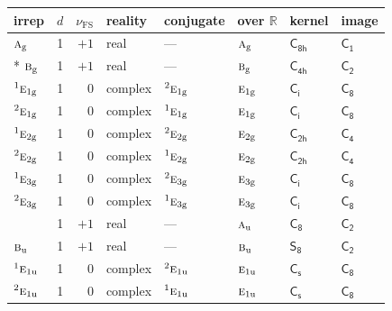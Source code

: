 \documentclass[10pt,a4paper]{article}
\numberwithin{equation}{section}
\newcommand{\grp}[1]{\mathsf{#1}}
\newcommand{\irr}[1]{\text{\normalfont\scshape #1}}
\newcommand{\conjpair}[1]{{}^{#1}}
\newcommand{\detbox}[1]{{\setlength{\fboxsep}{1pt}\fbox{#1}}}
\newcommand{\ptag}[1]{\mathrm{#1}}
\newcommand{\fsind}{\nu_{\mathrm{FS}}}
\begin{document}
{\small\renewcommand{\arraystretch}{1.25}\setlength{\tabcolsep}{4pt}\begin{longtable}{@{}lrrlllll@{}}\toprule
irrep & $d$ & $\fsind$ & reality & conjugate & over $\mathbb{R}$ & kernel & image\\\midrule\endhead
\bottomrule\endfoot\endlastfoot
$\irr{a}_{\ptag{g}}$ & 1 & $+1$ & real & --- & $\irr{a}_{\ptag{g}}$ & \href{C8h.pdf}{$\grp{C_{8h}}$} & \href{C1.pdf}{$\grp{C_{1}}$}\\*
$\irr{b}_{\ptag{g}}$ & 1 & $+1$ & real & --- & $\irr{b}_{\ptag{g}}$ & \href{C4h.pdf}{$\grp{C_{4h}}$} & \href{C2.pdf}{$\grp{C_{2}}$}\\
$\conjpair{1}\irr{e}_{1\ptag{g}}$ & 1 & $0$ & complex & $\conjpair{2}\irr{e}_{1\ptag{g}}$ & $\irr{e}_{1\ptag{g}}$ & \href{S2.pdf}{$\grp{C_{i}}$} & \href{C8.pdf}{$\grp{C_{8}}$}\\
$\conjpair{2}\irr{e}_{1\ptag{g}}$ & 1 & $0$ & complex & $\conjpair{1}\irr{e}_{1\ptag{g}}$ & $\irr{e}_{1\ptag{g}}$ & \href{S2.pdf}{$\grp{C_{i}}$} & \href{C8.pdf}{$\grp{C_{8}}$}\\
$\conjpair{1}\irr{e}_{2\ptag{g}}$ & 1 & $0$ & complex & $\conjpair{2}\irr{e}_{2\ptag{g}}$ & $\irr{e}_{2\ptag{g}}$ & \href{C2h.pdf}{$\grp{C_{2h}}$} & \href{C4.pdf}{$\grp{C_{4}}$}\\
$\conjpair{2}\irr{e}_{2\ptag{g}}$ & 1 & $0$ & complex & $\conjpair{1}\irr{e}_{2\ptag{g}}$ & $\irr{e}_{2\ptag{g}}$ & \href{C2h.pdf}{$\grp{C_{2h}}$} & \href{C4.pdf}{$\grp{C_{4}}$}\\
$\conjpair{1}\irr{e}_{3\ptag{g}}$ & 1 & $0$ & complex & $\conjpair{2}\irr{e}_{3\ptag{g}}$ & $\irr{e}_{3\ptag{g}}$ & \href{S2.pdf}{$\grp{C_{i}}$} & \href{C8.pdf}{$\grp{C_{8}}$}\\
$\conjpair{2}\irr{e}_{3\ptag{g}}$ & 1 & $0$ & complex & $\conjpair{1}\irr{e}_{3\ptag{g}}$ & $\irr{e}_{3\ptag{g}}$ & \href{S2.pdf}{$\grp{C_{i}}$} & \href{C8.pdf}{$\grp{C_{8}}$}\\
\detbox{$\irr{a}_{\ptag{u}}$} & 1 & $+1$ & real & --- & $\irr{a}_{\ptag{u}}$ & \href{C8.pdf}{$\grp{C_{8}}$} & \href{C2.pdf}{$\grp{C_{2}}$}\\
$\irr{b}_{\ptag{u}}$ & 1 & $+1$ & real & --- & $\irr{b}_{\ptag{u}}$ & \href{S8.pdf}{$\grp{S_{8}}$} & \href{C2.pdf}{$\grp{C_{2}}$}\\
$\conjpair{1}\irr{e}_{1\ptag{u}}$ & 1 & $0$ & complex & $\conjpair{2}\irr{e}_{1\ptag{u}}$ & $\irr{e}_{1\ptag{u}}$ & \href{C1v.pdf}{$\grp{C_{s}}$} & \href{C8.pdf}{$\grp{C_{8}}$}\\
$\conjpair{2}\irr{e}_{1\ptag{u}}$ & 1 & $0$ & complex & $\conjpair{1}\irr{e}_{1\ptag{u}}$ & $\irr{e}_{1\ptag{u}}$ & \href{C1v.pdf}{$\grp{C_{s}}$} & \href{C8.pdf}{$\grp{C_{8}}$}\\

\end{longtable}}
\end{document}
